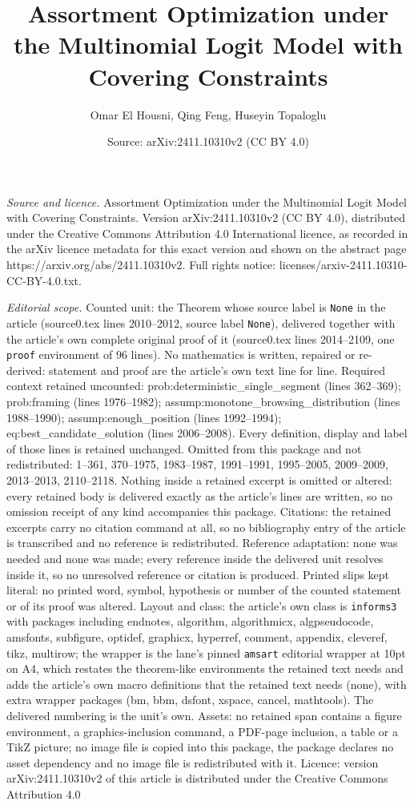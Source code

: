 \documentclass[10pt,a4paper]{amsart}
\title[Assortment Optimization under the Multinomial Logit Model wi]{Assortment Optimization under the Multinomial Logit Model with Covering Constraints}
\author{Omar El Housni, Qing Feng, Huseyin Topaloglu}
\date{Source: arXiv:2411.10310v2 (CC BY 4.0)}
\begin{document}
\maketitle

\noindent\emph{Source and licence.} Assortment Optimization under the Multinomial Logit Model with Covering Constraints. Version arXiv:2411.10310v2 (CC BY 4.0), distributed under the Creative Commons Attribution 4.0 International licence, as recorded in the arXiv licence metadata for this exact version and shown on the abstract page https://arxiv.org/abs/2411.10310v2. Full rights notice: licenses/arxiv-2411.10310-CC-BY-4.0.txt.\par\smallskip

\noindent\textit{Editorial scope.} Counted unit: the Theorem whose source label is \texttt{None} in the article (source0.tex lines 2010--2012, source label \texttt{None}), delivered together with the article's own complete original proof of it (source0.tex lines 2014--2109, one \texttt{proof} environment of 96 lines). No mathematics is written, repaired or re-derived: statement and proof are the article's own text line for line. Required context retained uncounted: prob:deterministic\_single\_segment (lines 362--369); prob:framing (lines 1976--1982); assump:monotone\_browsing\_distribution (lines 1988--1990); assump:enough\_position (lines 1992--1994); eq:best\_candidate\_solution (lines 2006--2008). Every definition, display and label of those lines is retained unchanged. Omitted from this package and not redistributed: 1--361, 370--1975, 1983--1987, 1991--1991, 1995--2005, 2009--2009, 2013--2013, 2110--2118. Nothing inside a retained excerpt is omitted or altered: every retained body is delivered exactly as the article's lines are written, so no omission receipt of any kind accompanies this package. Citations: the retained excerpts carry no citation command at all, so no bibliography entry of the article is transcribed and no reference is redistributed. Reference adaptation: none was needed and none was made; every reference inside the delivered unit resolves inside it, so no unresolved reference or citation is produced. Printed slips kept literal: no printed word, symbol, hypothesis or number of the counted statement or of its proof was altered. Layout and class: the article's own class is \texttt{informs3} with packages including endnotes, algorithm, algorithmicx, algpseudocode, amsfonts, subfigure, optidef, graphicx, hyperref, comment, appendix, cleveref, tikz, multirow; the wrapper is the lane's pinned \texttt{amsart} editorial wrapper at 10pt on A4, which restates the theorem-like environments the retained text needs and adds the article's own macro definitions that the retained text needs (none), with extra wrapper packages (bm, bbm, dsfont, xspace, cancel, mathtools). The delivered numbering is the unit's own. Assets: no retained span contains a figure environment, a graphics-inclusion command, a PDF-page inclusion, a table or a TikZ picture; no image file is copied into this package, the package declares no asset dependency and no image file is redistributed with it. Licence: version arXiv:2411.10310v2 of this article is distributed under the Creative Commons Attribution 4.0 
\end{document}
